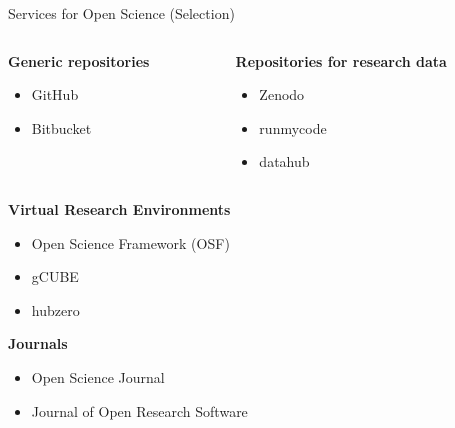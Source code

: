 \documentclass{intbeamer}
\begin{document}
\begin{frame}{Services for Open Science (Selection)}

\begin{columns}[T]
\begin{column}{.45\linewidth}
\textbf{Generic repositories}
\begin{itemize}
\item GitHub
\item Bitbucket
\end{itemize}
\end{column}
%
\begin{column}{.45\linewidth}
\textbf{Repositories for research data}
\begin{itemize}
\item Zenodo
\item runmycode
\item datahub
\end{itemize}
\end{column}
\end{columns}

\vfill

\textbf{Virtual Research Environments}
\begin{itemize}
\item Open Science Framework (OSF)
\item gCUBE
\item hubzero
\end{itemize}

\vfill

\textbf{Journals}
\begin{itemize}
\item Open Science Journal
\item Journal of Open Research Software
\end{itemize}

\end{frame}
\end{document}
